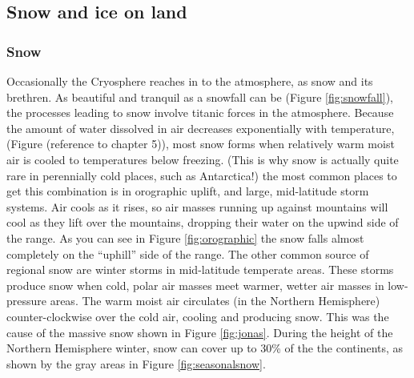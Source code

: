 \subsection{Snow and ice on land}
\subsubsection{Snow}\label{snow_talk} Occasionally the Cryosphere reaches in to the atmosphere, as snow and its brethren. As beautiful and tranquil as a snowfall can be (Figure \ref{fig:snowfall}), the processes leading to snow involve titanic forces in the atmosphere.  Because the amount of water dissolved in air decreases exponentially with temperature, (Figure (reference to chapter 5)), most snow forms when relatively warm moist air is cooled to temperatures below freezing. (This is why snow is actually quite rare in perennially cold places, such as Antarctica!) the most common places to get this combination is in orographic uplift, and large, mid-latitude storm systems. Air cools as it rises, so air masses running up against mountains will cool as they lift over the mountains, dropping their water on the upwind side of the range. As you can see in Figure \ref{fig:orographic} the snow falls almost completely on the ``uphill'' side of the range. The other common source of regional snow are winter storms in mid-latitude temperate areas. These storms produce snow when cold, polar air masses meet warmer, wetter air masses in low-pressure areas. The warm moist air circulates (in the Northern Hemisphere) counter-clockwise over the cold air, cooling and producing snow. This was the cause of the massive snow shown in Figure \ref{fig:jonas}. During the height of the Northern Hemisphere winter, snow can cover up to 30\% of the the continents, as shown by the gray areas in Figure \ref{fig:seasonalsnow}.\\

